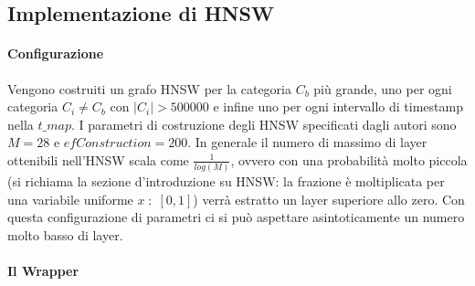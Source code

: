 
\subsection{Implementazione di HNSW}

\paragraph{Configurazione}

Vengono costruiti un grafo HNSW per la categoria $C_b$ pi\`u grande, uno per ogni categoria $C_i \ne C_b$ con $|C_i| > 500000$ e infine uno per ogni intervallo di timestamp nella $t\_map$.
I parametri di costruzione degli HNSW specificati dagli autori sono $M = 28$ e $efConstruction = 200$.
In generale il numero di massimo di layer ottenibili nell'HNSW scala come $\frac 1 {log(M)}$, ovvero con una probabilit\`a molto piccola (si richiama la sezione d'introduzione su HNSW: la frazione \`e moltiplicata per una variabile uniforme $x \; : \; [0,1]$) verr\`a estratto un layer superiore allo zero. Con questa configurazione di parametri ci si pu\`o aspettare asintoticamente un numero molto basso di layer.

\paragraph{Il Wrapper}

